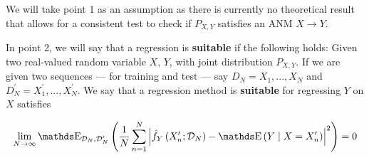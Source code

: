 We will take point 1 as an assumption as there is currently no theoretical result that allows for a consistent 
test to check if $P_{X, Y}$ satisfies an ANM $X \rightarrow Y$. 

In point 2, we will say that a regression is \textbf{suitable} if the following holds:
Given two real-valued random variable $X$, $Y$, with joint distribution $P_{X, Y}$. If 
we are given two sequences --- for training and test --- say $D_N = X_1, ..., X_N$ and 
$D_N^\prime = X^\prime_1, ..., X^\prime_N$. We say that a regression method is \textbf{suitable} for 
regressing $Y$ on $X$ satisfies

$$
\lim _{N \rightarrow \infty} \E_{\mathcal{D}_{N}, \mathcal{D}_{N}^{\prime}}\left(\frac{1}{N} 
\sum_{n=1}^{N}\left|\hat{f}_{Y}\left(X_{n}^{\prime} ; 
\mathcal{D}_{N}\right)-\E\left(Y \mid X=X_{n}^{\prime}\right)\right|^{2}\right)=0
$$



